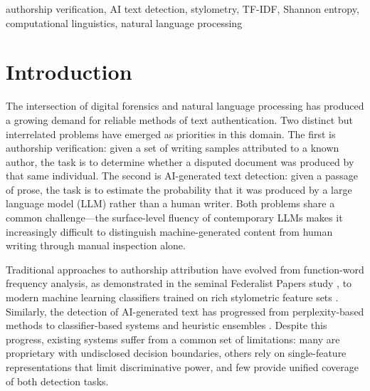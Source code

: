 \documentclass[conference]{IEEEtran}
\begin{document}
\begin{IEEEkeywords}
authorship verification, AI text detection, stylometry, TF-IDF, Shannon entropy, computational linguistics, natural language processing
\end{IEEEkeywords}

\section{Introduction}

The intersection of digital forensics and natural language processing has
produced a growing demand for reliable methods of text authentication. Two
distinct but interrelated problems have emerged as priorities in this domain.
The first is authorship verification: given a set of writing samples attributed
to a known author, the task is to determine whether a disputed document was
produced by that same individual. The second is AI-generated text detection:
given a passage of prose, the task is to estimate the probability that it was
produced by a large language model (LLM) rather than a human writer. Both
problems share a common challenge—the surface-level fluency of contemporary
LLMs makes it increasingly difficult to distinguish machine-generated content
from human writing through manual inspection alone.

Traditional approaches to authorship attribution have evolved from
function-word frequency analysis, as demonstrated in the seminal Federalist
Papers study \cite{mosteller1963inference}, to modern machine learning
classifiers trained on rich stylometric feature sets \cite{abbasi2008writeprints}.
Similarly, the detection of AI-generated text has progressed from
perplexity-based methods to classifier-based systems \cite{gehrmann2019gltr}
and heuristic ensembles \cite{kirchenbauer2023watermark}. Despite this
progress, existing systems suffer from a common set of limitations: many are
proprietary with undisclosed decision boundaries, others rely on single-feature
representations that limit discriminative power, and few provide unified
coverage of both detection tasks.
\end{document}
